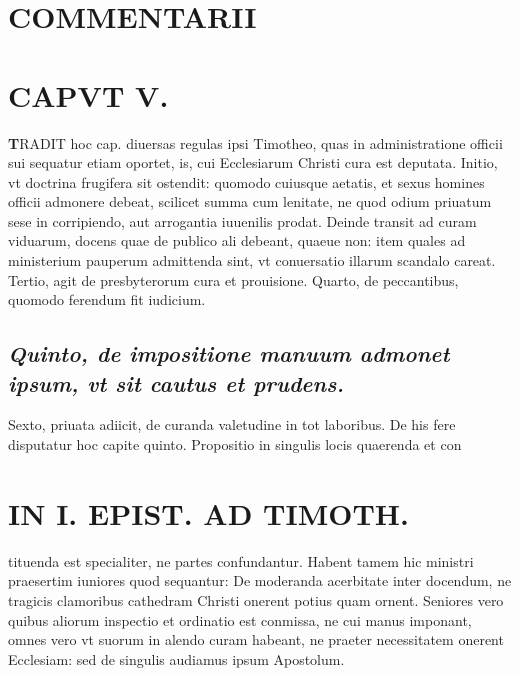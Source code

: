 \documentclass{article}
\begin{document}
\begin{pages}
\section*{COMMENTARII }
\marginpar{[ p.116 ]}
\endnumbering\beginnumbering\section{CAPVT V.}\pstart \huge\textbf{T}\normalsize RADIT hoc cap. diuersas regulas ipsi Timotheo, quas in administratione officii sui sequatur etiam oportet, is, cui Ecclesiarum Christi cura est deputata. Initio, vt doctrina frugifera sit ostendit: quomodo cuiusque aetatis, et sexus homines officii admonere debeat, scilicet summa cum lenitate, ne quod odium priuatum sese in corripiendo, aut arrogantia iuuenilis prodat.  \pend\pstart Deinde transit ad curam viduarum, docens quae de publico ali debeant, quaeue non: item quales ad ministerium pauperum admittenda sint, vt conuersatio illarum scandalo careat.  \pend\pstart Tertio, agit de presbyterorum cura et prouisione.  \pend\pstart Quarto, de peccantibus, quomodo ferendum fit iudicium.  \pend
{}
{}
\subsection*{\textit{Quinto, de impositione manuum admonet ipsum, vt sit cautus et prudens. }}\pstart Sexto, priuata adiicit, de curanda valetudine in tot laboribus. De his fere disputatur hoc capite quinto.  \pend\pstart Propositio in singulis locis quaerenda et con  \pend
\section*{IN I. EPIST. AD TIMOTH. }
\marginpar{[ p.117 ]}\pstart tituenda est specialiter, ne partes confundantur. Habent tamem hic ministri praesertim iuniores quod sequantur: De moderanda acerbitate inter docendum, ne tragicis clamoribus  cathedram Christi onerent potius quam ornent. Seniores vero quibus aliorum inspectio et ordinatio est conmissa, ne cui manus imponant, omnes vero vt suorum in alendo curam habeant, ne praeter necessitatem onerent Ecclesiam: sed de singulis audiamus ipsum Apostolum.  \pend
{}
{}

\end{pages}
\end{document}

